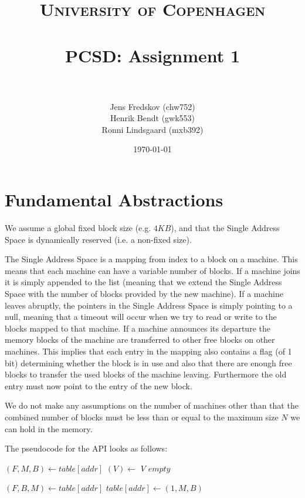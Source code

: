 \documentclass[a4paper, 11pt]{article}
\title{ 
\normalfont \normalsize 
\textsc{University of Copenhagen} \\ [25pt]
\horrule{0.5pt} \\[0.4cm]
\huge PCSD: Assignment 1 \\
\horrule{2pt} \\[0.5cm]
}
\author{Jens Fredskov (chw752)\\Henrik Bendt (gwk553)\\Ronni Lindsgaard (mxb392)} %
\date{\normalsize\today} %
\begin{document}
\maketitle

\section{Fundamental Abstractions} %
\label{sec:fundamental_abstractions}

We assume a global fixed block size (e.g. $4KB$), and that the Single Address Space is dynamically reserved (i.e. a non-fixed size).

The Single Address Space is a mapping from index to a block on a machine. This means that each machine can have a variable number of blocks. If a machine joins it is simply appended to the list (meaning that we extend the Single Address Space with the number of blocks provided by the new machine). If a machine leaves abruptly, the pointers in the Single Address Space is simply pointing to a null, meaning that a timeout will occur when we try to read or write to the blocks mapped to that machine. If a machine announces its departure the memory blocks of the machine are transferred to other free blocks on other machines. This implies that each entry in the mapping also contains a flag (of 1 bit) determining whether the block is in use and also that there are enough free blocks to transfer the used blocks of the machine leaving. Furthermore the old entry must now point to the entry of the new block.

We do not make any assumptions on the number of machines other than that the combined number of blocks must be less than or equal to the maximum size $N$ we can hold in the memory.

The pseudocode for the API looks as follows:

\begin{algorithmic}
    \State $(F, M, B) \gets table[addr]$
        \State $(V) \gets$ 
        \State \Return $V$
    \Else
        \State \Return $empty$
    \EndIf
\EndFunction
\end{algorithmic}

\begin{algorithmic}
    \State $(F, B, M) \gets table[addr]$
    \State {}
    \State $table[addr] \gets (1, M, B)$
\EndFunction
\end{algorithmic}
\end{document}
